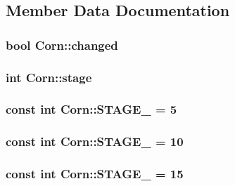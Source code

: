 \subsection{Member Data Documentation}
\hypertarget{classCorn_a1b3eeae171a4920a7816acc8e3d15877}{
\subsubsection[{changed}]{\setlength{\rightskip}{0pt plus 5cm}bool Corn\-::changed}}\label{classCorn_a1b3eeae171a4920a7816acc8e3d15877}
\hypertarget{classCorn_af36e334c7841e04e5e2057e4622efc35}{
\subsubsection[{stage}]{\setlength{\rightskip}{0pt plus 5cm}int Corn\-::stage}}\label{classCorn_af36e334c7841e04e5e2057e4622efc35}
\hypertarget{classCorn_a06dcd52a729fca8910331e6a2fd59224}{
\subsubsection[{S\-T\-A\-G\-E\-\_\-0}]{\setlength{\rightskip}{0pt plus 5cm}const int Corn\-::\-S\-T\-A\-G\-E\-\_ = 5\hspace{0.3cm}{\ttfamily [static]}}}\label{classCorn_a06dcd52a729fca8910331e6a2fd59224}
\hypertarget{classCorn_ac82c4d495b1f3337e56adcde2d44bdba}{
\subsubsection[{S\-T\-A\-G\-E\-\_\-1}]{\setlength{\rightskip}{0pt plus 5cm}const int Corn\-::\-S\-T\-A\-G\-E\-\_ = 10\hspace{0.3cm}{\ttfamily [static]}}}\label{classCorn_ac82c4d495b1f3337e56adcde2d44bdba}
\hypertarget{classCorn_a098322daae5849ac79fb71a39475376d}{
\subsubsection[{S\-T\-A\-G\-E\-\_\-2}]{\setlength{\rightskip}{0pt plus 5cm}const int Corn\-::\-S\-T\-A\-G\-E\-\_ = 15\hspace{0.3cm}{\ttfamily [static]}}}\label{classCorn_a098322daae5849ac79fb71a39475376d}
